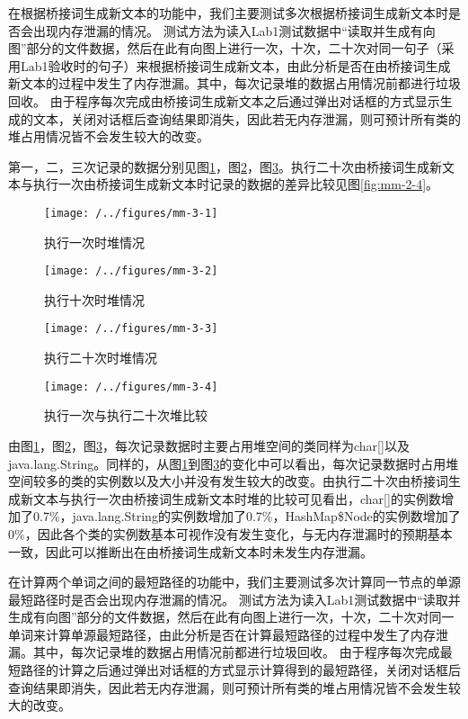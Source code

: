 在根据桥接词生成新文本的功能中，我们主要测试多次根据桥接词生成新文本时是否会出现内存泄漏的情况。
测试方法为读入Lab1测试数据中“读取并生成有向图”部分的文件数据，然后在此有向图上进行一次，十次，二十次对同一句子（采用Lab1验收时的句子）来根据桥接词生成新文本，由此分析是否在由桥接词生成新文本的过程中发生了内存泄漏。其中，每次记录堆的数据占用情况前都进行垃圾回收。
由于程序每次完成由桥接词生成新文本之后通过弹出对话框的方式显示生成的文本，关闭对话框后查询结果即消失，因此若无内存泄漏，则可预计所有类的堆占用情况皆不会发生较大的改变。

第一，二，三次记录的数据分别见图\ref{fig:mm-3-1}，图\ref{fig:mm-3-2}，图\ref{fig:mm-3-3}。执行二十次由桥接词生成新文本与执行一次由桥接词生成新文本时记录的数据的差异比较见图\ref{fig:mm-2-4}。

\begin{figure}
\centering
\texttt{[image: /../figures/mm-3-1]}
\caption{执行一次时堆情况}
\label{fig:mm-3-1}
\end{figure}

\begin{figure}
\centering
\texttt{[image: /../figures/mm-3-2]}
\caption{执行十次时堆情况}
\label{fig:mm-3-2}
\end{figure}

\begin{figure}
\centering
\texttt{[image: /../figures/mm-3-3]}
\caption{执行二十次时堆情况}
\label{fig:mm-3-3}
\end{figure}

\begin{figure}
\centering
\texttt{[image: /../figures/mm-3-4]}
\caption{执行一次与执行二十次堆比较}
\label{fig:mm-3-4}
\end{figure}

由图\ref{fig:mm-3-1}，图\ref{fig:mm-3-2}，图\ref{fig:mm-3-3}，每次记录数据时主要占用堆空间的类同样为char[]以及java.lang.String。同样的，从图\ref{fig:mm-3-1}到图\ref{fig:mm-3-3}的变化中可以看出，每次记录数据时占用堆空间较多的类的实例数以及大小并没有发生较大的改变。由执行二十次由桥接词生成新文本与执行一次由桥接词生成新文本时堆的比较可见看出，char[]的实例数增加了0.7\%，java.lang.String的实例数增加了0.7\%，HashMap\$Node的实例数增加了0\%，因此各个类的实例数基本可视作没有发生变化，与无内存泄漏时的预期基本一致，因此可以推断出在由桥接词生成新文本时未发生内存泄漏。

在计算两个单词之间的最短路径的功能中，我们主要测试多次计算同一节点的单源最短路径时是否会出现内存泄漏的情况。
测试方法为读入Lab1测试数据中“读取并生成有向图”部分的文件数据，然后在此有向图上进行一次，十次，二十次对同一单词来计算单源最短路径，由此分析是否在计算最短路径的过程中发生了内存泄漏。其中，每次记录堆的数据占用情况前都进行垃圾回收。
由于程序每次完成最短路径的计算之后通过弹出对话框的方式显示计算得到的最短路径，关闭对话框后查询结果即消失，因此若无内存泄漏，则可预计所有类的堆占用情况皆不会发生较大的改变。

